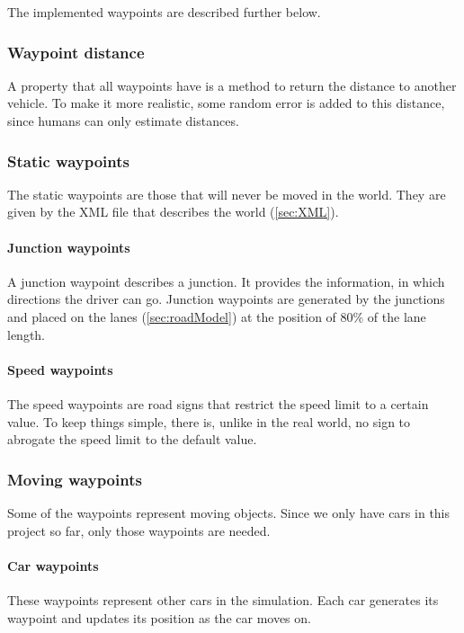 \noindent The implemented waypoints are described further below. \\

\subsubsection{Waypoint distance}
\label{sec:movingWPDistance}
A property that all waypoints have is a method to 
return the distance to another vehicle. To make it more realistic, some random 
error is added to this distance, since humans can only estimate distances.

\subsubsection{Static waypoints}

The static waypoints are those that will never be moved in the world.
They are given by the XML file that describes the world (\ref{sec:XML}).

\paragraph{Junction waypoints}
A junction waypoint describes a junction. It provides the information, in
which directions the driver can go. Junction waypoints are generated by the
junctions and placed on the lanes (\ref{sec:roadModel}) at the position of
80\% of the lane length.

\paragraph{Speed waypoints}
The speed waypoints are road signs that restrict the speed limit to a certain
value. To keep things simple, there is, unlike in the real world, no sign to 
abrogate the speed limit to the default value. \\

\subsubsection{Moving waypoints}

Some of the waypoints represent moving objects. Since we only have cars in this
project so far, only those waypoints are needed. \\

\paragraph{Car waypoints}
These waypoints represent other cars in the simulation. Each car generates its
waypoint and updates its position as the car moves on.

